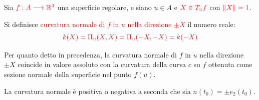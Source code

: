 \begin{osservazione}
\begin{center}
        \end{center}
        \end{osservazione}

        \begin{definizione}
        \mbox{}

        Sia $\textcolor{red}{f : A \longrightarrow \mathbb{R}^3}$ una superficie regolare, e siano $u \in A$ e $\textcolor{red}{X \in T_u f}$ con $\textcolor{red}{\lVert X\rVert = 1}$.
        
        Si definisce \textcolor{red}{curvatura normale di $f$ in $u$ nella direzione $\pm X$} il numero reale:
        \[
        \textcolor{red}{k(X) = \Pi_u(X,X) = \Pi_u(-X,-X) = k(-X)}
        \]
        \end{definizione}

        \begin{osservazione}
        Per quanto detto in precedenza, la curvatura normale di $f$ in $u$ nella direzione $\pm X$ coincide in valore assoluto con la curvatura della curva $c$ su $f$ ottenuta come sezione normale della superficie nel punto $f(u)$.
        
        La curvatura normale è positiva o negativa a seconda che sia $n(t_0) = \pm e_2(t_0)$.
        \end{osservazione}

